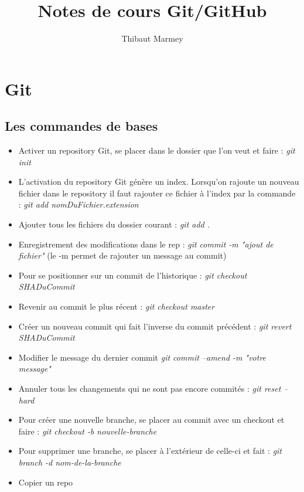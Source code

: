 \documentclass[12pt,a4paper]{article}
\author{Thibaut Marmey}
\title{Notes de cours Git/GitHub}
\begin{document}
	\maketitle

\begin{normalsize}
\tableofcontents
\end{normalsize}

\section{Git}
\subsection{Les commandes de bases}
\begin{itemize}
\item Activer un repository Git, se placer dans le dossier que l’on veut et faire : 
\newline \textit{git init }
\item L’activation du repository Git génère un index. Lorsqu’on rajoute un nouveau fichier dans le repository il faut rajouter ce fichier à l’index par la commande :
\newline \textit{git add nomDuFichier.extension}
\item Ajouter tous les fichiers du dossier courant :
\newline \textit{git add .}
\item Enregistrement des modifications dans le rep :
\newline \textit{git commit -m "ajout de fichier"} (le -m permet de rajouter un message au commit)
\item Pour se positionner sur un commit de l'historique :
\newline \textit{git checkout SHADuCommit}
\item Revenir au commit le plus récent : 
\newline \textit{git checkout master}
\item Créer un nouveau commit qui fait l'inverse du commit précédent :
\newline \textit{git revert SHADuCommit}
\item Modifier le message du dernier commit
\newline \textit{git commit --amend -m "votre message"}
\item Annuler tous les changements qui ne sont pas encore commités :
\newline \textit{git reset --hard}
\item Pour créer une nouvelle branche, se placer au commit avec un checkout et faire :
\newline \textit{git checkout -b nouvelle-branche}
\item Pour supprimer une branche, se placer à l'extérieur de celle-ci et fait :
\textit{git branch -d nom-de-la-branche}
\item Copier un repo
\end{itemize}
\end{document}
